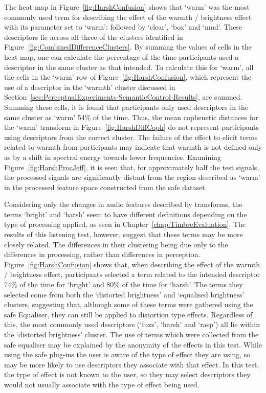 			The heat map in Figure~\ref{fig:HarshConfusion} shows that `warm' was the most commonly used term
			for describing the effect of the warmth / brightness effect with its parameter set to `warm':
			followed by `clear', `box' and `mud'. These descriptors lie across all three of the clusters
			identified in Figure~\ref{fig:CombinedDifferenceClusters}. By summing the values of cells in the
			heat map, one can calculate the percentage of the time participants used a descriptor in the same
			cluster as that intended. To calculate this for `warm', all the cells in the `warm' row of
			Figure~\ref{fig:HarshConfusion}, which represent the use of a descriptor in the `warmth' cluster
			discussed in Section~\ref{sec:PerceptualExperiments-SemanticControl-Results}, are summed. Summing
			these cells, it is found that participants only used descriptors in the same cluster as `warm' 54\%
			of the time.  Thus, the mean cophenetic distances for the `warm' transform in
			Figure~\ref{fig:HarshDiffCoph} do not represent participants using descriptors from the correct
			cluster. The failure of the effect to elicit terms related to warmth from participants may indicate
			that warmth is not defined only as by a shift in spectral energy towards lower frequencies.
			Examining Figure~\ref{fig:HarshProcJeff}, it is seen that, for approximately half the test signals,
			the processed signals are significantly distant from the region described as `warm' in the
			processed feature space constructed from the \acrshort{safe} dataset.
			
			Considering only the changes in audio features described by transforms, the terms `bright' and
			`harsh' seem to have different definitions depending on the type of processing applied, as seen in
			Chapter~\ref{chap:TimbreEvaluation}. The results of this listening test, however, suggest that
			these terms may be more closely related. The differences in their clustering being due only to the
			differences in processing, rather than differences in perception. Figure~\ref{fig:HarshConfusion}
			shows that, when describing the effect of the warmth / brightness effect, participants selected a
			term related to the intended descriptor 74\% of the time for `bright' and 80\% of the time for
			`harsh'. The terms they selected come from both the `distorted brightness' and `equalised
			brightness' clusters, suggesting that, although some of these terms were gathered using the
			\acrshort{safe} Equaliser, they can still be applied to distortion type effects. Regardless of
			this, the most commonly used descriptors (`fuzz', `harsh' and `rasp') all lie within the `distorted
			brightness' cluster. The use of terms which were collected from the \acrshort{safe} equaliser may
			be explained by the anonymity of the effects in this test. While using the \acrshort{safe} plug-ins
			the user is aware of the type of effect they are using, so may be more likely to use descriptors
			they associate with that effect. In this test, the type of effect is not known to the user, so they
			may select descriptors they would not usually associate with the type of effect being used.

